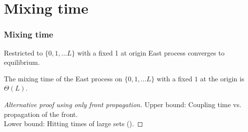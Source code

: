 \documentclass{beamer}
\begin{document}
\section{Mixing time}
\begin{frame}
\frametitle{Mixing time}
\pause
Restricted to $\{0, 1, ... L\}$ with a fixed 1 at origin East process converges to equilibrium. 
\pause
\begin{theorem}
The mixing time of the East process on $\{0, 1, ... L\}$ with a fixed $1$ at the origin is $\Theta(L)$. 
\end{theorem}
\pause
\begin{proof}[Alternative proof using only front propagation]
Upper bound: Coupling time vs. propagation of the front. \\
Lower bound: Hitting times of large sets (\cite{peres2015mixing}). 
\end{proof}
\end{frame}
\end{document}
